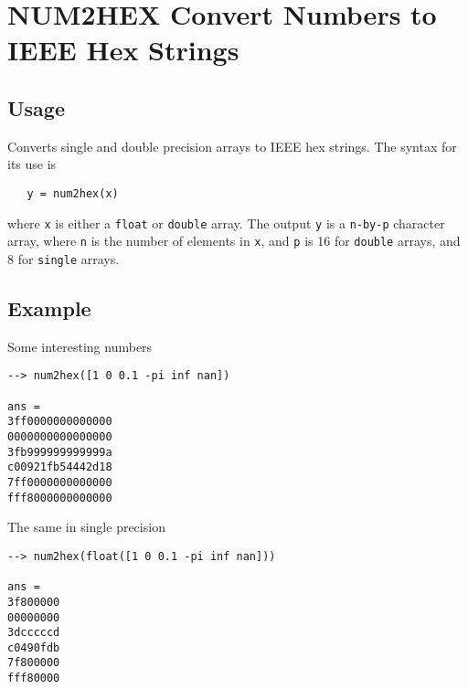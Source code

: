 \section{NUM2HEX Convert Numbers to IEEE Hex Strings}

\subsection{Usage}

Converts single and double precision arrays to IEEE hex strings.  The
syntax for its use is
\begin{verbatim}
   y = num2hex(x)
\end{verbatim}
where \verb|x| is either a \verb|float| or \verb|double| array.  The output \verb|y| is
a \verb|n-by-p| character array, where \verb|n| is the number of elements in \verb|x|,
and \verb|p| is 16 for \verb|double| arrays, and 8 for \verb|single| arrays.
\subsection{Example}

Some interesting numbers
\begin{verbatim}
--> num2hex([1 0 0.1 -pi inf nan])

ans = 
3ff0000000000000
0000000000000000
3fb999999999999a
c00921fb54442d18
7ff0000000000000
fff8000000000000
\end{verbatim}
The same in single precision
\begin{verbatim}
--> num2hex(float([1 0 0.1 -pi inf nan]))

ans = 
3f800000
00000000
3dcccccd
c0490fdb
7f800000
fff80000
\end{verbatim}

